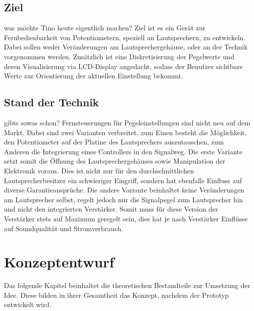 \documentclass[11pt, titlepage, fleqn]{report}
\begin{document}
	\section*{Ziel}
		was möchte Tino heute eigentlich machen?\newline
		Ziel ist es ein Gerät zur Fernbedienbarkeit von Potentiometern, speziell an Lautsprechern, zu entwickeln. Dabei sollen weder Veränderungen am Lautsprechergehäuse, oder an der Technik vorgenommen werden. Zusätzlich ist eine Diskretisierung der Pegelwerte und deren Visualisierung via LCD-Display angedacht, sodass der Benutzer sichtbare 
		Werte zur Orientierung der aktuellen Einstellung bekommt. 
	\section*{Stand der Technik}	
		gibts sowas schon?\newline
		Fernsteuerungen für Pegeleinstellungen sind nicht neu auf dem Markt. Dabei sind zwei Varianten verbreitet, zum Einen besteht die Möglichkeit, den Potentiometer auf der Platine des Lautsprechers auszutauschen, zum Anderen die Integrierung eines Controllers in den Signalweg. Die erste Variante setzt somit die Öffnung des Lautsprechergehäuses sowie Manipulation der Elektronik voraus. Dies ist nicht nur für den durchschnittlichen
		Lautsprecherbesitzer ein schwieriger Eingriff, sondern hat ebenfalls Einfluss auf diverse Garantieansprüche.\newline
		Die andere Variante beinhaltet keine Veränderungen am Lautsprecher selbst, regelt jedoch nur die Signalpegel zum Lautsprecher hin und nicht den integrierten Verstärker. Somit muss für diese Version der Verstärker stets auf Maximum geregelt sein, dies hat je nach Verstärker Einflüsse auf Soundqualität und Stromverbrauch.
	\chapter{Konzeptentwurf}
		Das folgende Kapitel beinhaltet die theoretischen Bestandteile zur Umsetzung der Idee. Diese bilden in ihrer Gesamtheit das Konzept,
		nachdem der Prototyp entwickelt wird.
\end{document}
